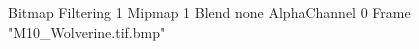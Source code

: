 {Bitmap
	{Filtering 1}
	{Mipmap 1}
	{Blend none}
	{AlphaChannel 0}
	{Frame "M10_Wolverine.tif.bmp"}
}
